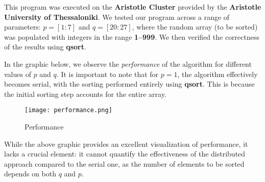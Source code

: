 \documentclass[12pt]{report}
\begin{document}
\begin{center}
\end{center}

This program was executed on the \textbf{Aristotle Cluster} provided by the \textbf{Aristotle University of Thessaloniki}. We tested our program across a range of parameters: $p = [1:7]$ and $q = [20:27]$, where the random array (to be sorted) was populated with integers in the range \textbf{1–999}. We then verified the correctness of the results using \textbf{qsort}. \newpage

In the graphic below, we observe the \textit{performance} of the algorithm for different values of $p$ and $q$. It is important to note that for $p=1$, the algorithm effectively becomes serial, with the sorting performed entirely using \textbf{qsort}. This is because the initial sorting step accounts for the entire array.

\begin{figure}[H]
    \centering
    \texttt{[image: performance.png]}
    \caption{Performance}
    \label{fig:enter-label}
\end{figure}

While the above graphic provides an excellent visualization of performance, it lacks a crucial element: it cannot quantify the effectiveness of the distributed approach compared to the serial one, as the number of elements to be sorted depends on both $q$ and $p$.
\end{document}
